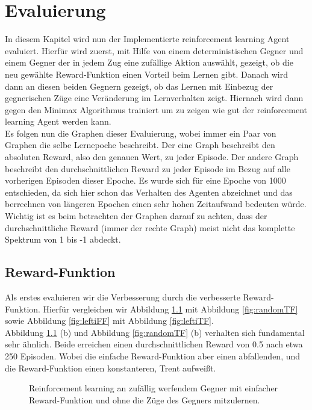 \chapter{Evaluierung}%

\label{cha:Eval}

In diesem Kapitel wird nun der Implementierte reinforcement learning Agent evaluiert. Hierfür wird zuerst, mit Hilfe von einem deterministischen Gegner und einem Gegner der in jedem Zug eine zufällige Aktion auswählt, gezeigt, ob die neu gewählte Reward-Funktion einen Vorteil beim Lernen gibt. Danach wird dann an diesen beiden Gegnern gezeigt, ob das Lernen mit Einbezug der gegnerischen Züge eine Veränderung im Lernverhalten zeigt. Hiernach wird dann gegen den Minimax Algorithmus trainiert um zu zeigen wie gut der reinforcement learning Agent werden kann. \\Es folgen nun die Graphen dieser Evaluierung, wobei immer ein Paar von Graphen die selbe Lernepoche beschreibt. Der eine Graph beschreibt den absoluten Reward, also den genauen Wert, zu jeder Episode. Der andere Graph beschreibt den durchschnittlichen Reward zu jeder Episode im Bezug auf alle vorherigen Episoden dieser Epoche.
Es wurde sich für eine Epoche von 1000 entschieden, da sich hier schon das Verhalten des Agenten abzeichnet und das berrechnen von längeren Epochen einen sehr hohen Zeitaufwand bedeuten würde.\\

Wichtig ist es beim betrachten der Graphen darauf zu achten, dass der durchschnittliche Reward (immer der rechte Graph) meist nicht das komplette Spektrum von 1 bis -1 abdeckt.

\section{Reward-Funktion}
Als erstes evaluieren wir die Verbesserung durch die verbesserte Reward-Funktion. Hierfür vergleichen wir Abbildung \ref{fig:randomFF} mit Abbildung \ref{fig:randomTF} sowie Abbildung \ref{fig:leftiFF} mit Abbildung \ref{fig:leftiTF}.\\
Abbildung \ref{fig:randomFF} (b) und Abbildung \ref{fig:randomTF} (b) verhalten sich fundamental sehr ähnlich. Beide erreichen einen durchschnittlichen Reward von 0.5 nach etwa 250 Episoden. Wobei die einfache Reward-Funktion aber einen abfallenden, und die Reward-Funktion einen konstanteren, Trent aufweißt.\\

\begin{figure}%
    \centering
    \qquad
    \caption{Reinforcement learning an zufällig werfendem Gegner mit einfacher Reward-Funktion und ohne die Züge des Gegners mitzulernen.}%
    \label{fig:randomFF}%
\end{figure}


